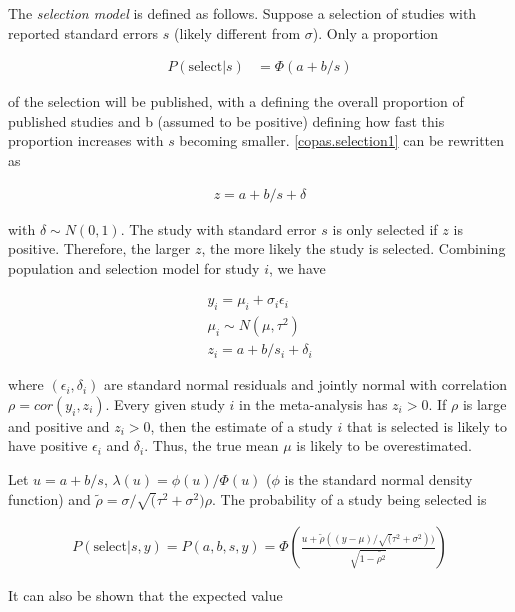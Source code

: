 \documentclass[11pt,a4paper,twoside]{book}\usepackage[]{graphicx}\usepackage[]{color}
\begin{document}
\vspace{0mm}
The \textit{selection model} is defined as follows. Suppose a selection of studies with reported standard errors $s$ (likely different from $\sigma$). Only a proportion 

\begin{align}
P(\textrm{select}|s) &= \Phi(a + b/s) \label{copas.selection1}
\end{align}

of the selection will be published, with a defining the overall proportion of published studies and b (assumed to be positive) defining how fast this proportion increases with $s$ becoming smaller. \ref{copas.selection1} can be rewritten as 

\begin{align}
z = a + b/s + \delta \label{copas.selection2}
\end{align}

with $\delta \sim N(0,1)$. The study with standard error $s$ is only selected if $z$ is positive. Therefore, the larger $z$, the more likely the study is selected.
Combining population and selection model for study $i$, we have 

\begin{align}
y_{i} = \mu_{i} + \sigma_{i}\epsilon_{i} \\
\mu_{i} \sim N(\mu, \tau^2) \\
z_{i} = a + b/s_{i} + \delta_{i}
\end{align}

where $(\epsilon_{i}, \delta_{i})$ are standard normal residuals and jointly normal with correlation $\rho = cor(y_{i}, z_{i})$. Every given study $i$ in the meta-analysis has $z_{i} > 0$. If $\rho$ is large and positive and $z_{i} > 0$, then the estimate of a study $i$ that is selected is likely to have positive $\epsilon_{i}$ and $\delta_{i}$. Thus, the true mean $\mu$ is likely to be overestimated. 

\vspace{0mm}
Let $u = a + b/s$, $\lambda(u) = \phi(u)/\Phi(u)$ ($\phi$ is the standard normal density function) and $\tilde{\rho} = \sigma/\sqrt(\tau^2 + \sigma^2) \rho$. The probability of a study being selected is

\begin{align}
P(\textrm{select}|s, y) = P(a,b,s,y) = \Phi(\frac{u + \tilde{\rho}((y - \mu)/\sqrt(\tau^2 + \sigma^2))}{\sqrt{1 - \tilde{\rho^2}}})
\end{align}

It can also be shown that the expected value 
\end{document}
